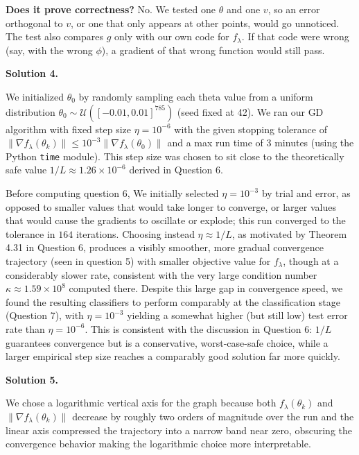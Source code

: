 \documentclass[12pt]{article}
\newcommand{\solution}[1]{\vspace{1em}\noindent \textbf{Solution #1.}\par}
\begin{document}
\vspace{1mm}

\textbf{Does it prove correctness?} No. We tested one $\theta$ and one $v$,
so an error orthogonal to $v$, or one that only appears at other points, would
go unnoticed. The test also compares $g$ only with our own code for $f_\lambda$. If that code were wrong (say, with the wrong $\phi$), a gradient of that wrong function would still pass.

\solution{4}

We initialized $\theta_0$ by randomly sampling each theta value from a uniform distribution $\theta_0 \sim \mathcal{U}([-0.01, 0.01]^{785})$ (seed fixed at 42). We ran our GD algorithm with fixed step size $\eta = 10^{-6}$ with the given stopping tolerance of $\|\nabla f_\lambda(\theta_k)\| \leq 10^{-3}\|\nabla f_\lambda(\theta_0)\|$ and a max run time of 3 minutes (using the Python \texttt{time} module). This step size was chosen to sit close to the theoretically safe value $1/L \approx 1.26 \times 10^{-6}$ derived in Question 6.

Before computing question 6, We initially selected $\eta = 10^{-3}$ by trial and error, as opposed to smaller values that would take longer to converge, or larger values that would cause the gradients to oscillate or explode; this run converged to the tolerance in $164$ iterations. Choosing instead $\eta \approx 1/L$, as motivated by Theorem 4.31 in Question 6, produces a visibly smoother, more gradual convergence trajectory (seen in question 5) with smaller objective value for $f_\lambda$, though at a considerably slower rate, consistent with the very large condition number $\kappa \approx 1.59 \times 10^8$ computed there. Despite this large gap in convergence speed, we found the resulting classifiers to perform comparably at the classification stage (Question 7), with $\eta = 10^{-3}$ yielding a somewhat higher (but still low) test error rate than $\eta = 10^{-6}$. This is consistent with the discussion in Question 6: $1/L$ guarantees convergence but is a conservative, worst-case-safe choice, while a larger empirical step size reaches a comparably good solution far more quickly.

\solution{5}

We chose a logarithmic vertical axis for the graph because both $f_\lambda(\theta_k)$ and $\|\nabla f_\lambda(\theta_k)\|$ decrease by roughly two orders of magnitude over the run and the linear axis compressed the trajectory into a narrow band near zero, obscuring the convergence behavior making the logarithmic choice more interpretable.
\end{document}
